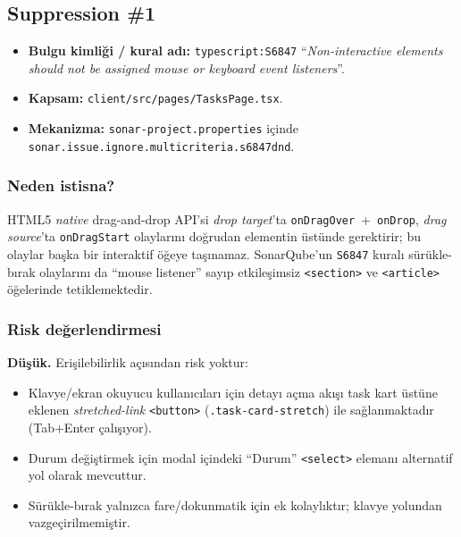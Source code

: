 \documentclass[conference]{IEEEtran}
\begin{document}
\subsection{Suppression \#1}

\begin{itemize}
\item \textbf{Bulgu kimliği / kural adı:} \texttt{typescript:S6847}
  ``\emph{Non-interactive elements should not be assigned mouse or
  keyboard event listeners}''.
\item \textbf{Kapsam:} \texttt{client/src/pages/TasksPage.tsx}.
\item \textbf{Mekanizma:} \texttt{sonar-project.properties} içinde
  \texttt{sonar.issue.ignore.multicriteria.s6847dnd}.
\end{itemize}

\subsubsection{Neden istisna?}
HTML5 \emph{native} drag-and-drop API'si \emph{drop target}'ta
\texttt{onDragOver}~+~\texttt{onDrop}, \emph{drag source}'ta
\texttt{onDragStart} olaylarını doğrudan elementin üstünde gerektirir;
bu olaylar başka bir interaktif öğeye taşınamaz. SonarQube'un
\texttt{S6847} kuralı sürükle-bırak olaylarını da ``mouse listener''
sayıp etkileşimsiz \texttt{<section>} ve \texttt{<article>} öğelerinde
tetiklemektedir.

\subsubsection{Risk değerlendirmesi}
\textbf{Düşük.} Erişilebilirlik açısından risk yoktur:
\begin{itemize}
\item Klavye/ekran okuyucu kullanıcıları için detayı açma akışı task kart
  üstüne eklenen \emph{stretched-link} \texttt{<button>}
  (\texttt{.task-card-stretch}) ile sağlanmaktadır
  (Tab+Enter çalışıyor).
\item Durum değiştirmek için modal içindeki ``Durum'' \texttt{<select>}
  elemanı alternatif yol olarak mevcuttur.
\item Sürükle-bırak yalnızca fare/dokunmatik için ek kolaylıktır;
  klavye yolundan vazgeçirilmemiştir.
\end{itemize}
\end{document}
